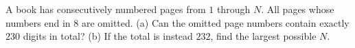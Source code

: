 A book has consecutively numbered pages from $1$ through $N$. All pages whose numbers end in $8$ are omitted. (a) Can the omitted page numbers contain exactly $230$ digits in total? (b) If the total is instead $232$, find the largest possible $N$.
